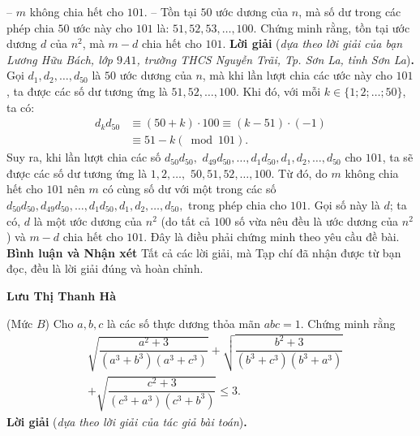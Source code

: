 \begin{multicols}{2}
	-- $m$ không chia hết cho $101$.
	\vskip 0.05cm
	-- Tồn tại $50$ ước dương của $n$, mà số dư trong các phép chia $50$ ước này cho $101$ là: $51, 52, 53, \ldots, 100.$ 
	\vskip 0.05cm
	Chứng minh rằng, tồn tại ước dương $d$ của $n^2$, mà $m-d$ chia hết cho $101$.
	\vskip 0.05cm
	\textbf{\color{thachthuctoanhoc}Lời giải} (\textit{dựa theo lời giải của bạn Lương Hữu Bách, lớp $9$A$1$, trường THCS Nguyễn Trãi, Tp. Sơn La, tỉnh Sơn La})\textbf{\color{thachthuctoanhoc}.}
	\vskip 0.05cm
	Gọi $d_1, d_2, \ldots, d_{50}$ là $50$ ước dương của $n$, mà khi lần lượt chia các ước này cho $101$, ta được các số dư tương ứng là $51, 52, \ldots, 100$.
	\vskip 0.05cm
	Khi đó, với mỗi $k \in \{1; 2; \ldots; 50\}$, ta có:
	\begin{align*}
		{d_k}{d_{50}} &\equiv \left( {50 + k} \right) \cdot 100 \equiv \left( {k - 51} \right) \cdot \left( { - 1} \right) \\
		&\equiv 51 - k\left( {\bmod 101} \right).
	\end{align*}
	Suy ra, khi lần lượt chia các số  ${d_{50}}{d_{50}},$ ${d_{49}}{d_{50}}, \ldots,{d_1}{d_{50}},d_1, d_2,\ldots,d_{50}$   cho $101$, ta sẽ được các số dư tương ứng là $1, 2,\ldots,$ $50, 51, 52, \ldots, 100$.
	\vskip 0.05cm
	Từ đó, do $m$ không chia hết cho $101$ nên $m$ có cùng số dư với một trong các số  $d_{50}d_{50},d_{49}d_{50}, \ldots,d_1d_{50},d_1,d_2, \ldots,d_{50},$ trong phép chia cho $101$. Gọi số này là $d$; ta có, $d$ là một ước dương của $n^2$ (do tất cả $100$ số vừa nêu đều là ước dương của $n^2$) và $m - d$ chia hết cho $101$. Đây là điều phải chứng minh theo yêu cầu đề bài.
	\vskip 0.05cm
	\textbf{\color{thachthuctoanhoc}Bình luận và Nhận xét}
	\vskip 0.05cm
	Tất cả các lời giải, mà Tạp chí đã nhận được từ bạn đọc, đều là lời giải đúng và hoàn chỉnh.
	\begin{flushright}
		\textbf{\color{thachthuctoanhoc}Lưu Thị Thanh Hà}
	\end{flushright}
	{}
	(Mức $B$) Cho $a, b, c$ là các số thực dương thỏa mãn $a b c=1$. Chứng minh rằng
	\begin{align*}
		&\sqrt{\dfrac{a^2\!+\!3}{\left(a^3\!+\!b^3\right)\!\left(a^3\!+\!c^3\right)}}\!+\!\sqrt{\dfrac{b^2\!+\!3}{\left(b^3\!+\!c^3\right)\!\left(b^3\!+\!a^3\right)}}\\
		&+\sqrt{\dfrac{c^2\!+\!3}{\left(c^3\!+\!a^3\right)\!\left(c^3\!+\!b^3\right)}} \leq 3.
	\end{align*}
	\textbf{\color{thachthuctoanhoc}Lời giải} (\textit{dựa theo lời giải của tác giả bài toán})\textbf{\color{thachthuctoanhoc}.}

\end{multicols}
